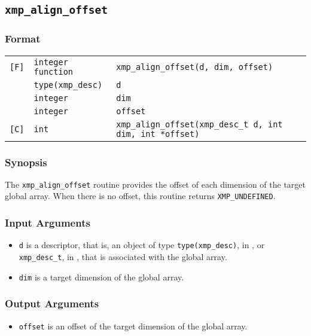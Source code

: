 \subsection{\tt xmp\_align\_offset}

\subsubsection*{Format}

\begin{tabular}{lll}

\verb![F]!& {\tt integer function}& {\tt xmp\_align\_offset(d, dim, offset)}\\
          & {\tt type(xmp\_desc)} & {\tt d}\\
          & {\tt integer} & {\tt dim}\\
          & {\tt integer} & {\tt offset}\\

\verb![C]!&  {\tt int}& {\tt xmp\_align\_offset(xmp\_desc\_t d, int dim, int *offset)}\\

\end{tabular}

\subsubsection*{Synopsis}

The {\tt xmp\_align\_offset} routine provides the offset of each dimension of the target global array. When there is no offset, this routine returns {\tt XMP\_UNDEFINED}.


\subsubsection*{Input Arguments}
\begin{itemize}
 \item {\tt d} is a descriptor, that is, an object of type 
       {\tt type(xmp\_desc)}, in {\XMPF}, or {\tt xmp\_desc\_t},
       in {\XMPC}, that is associated with the global array.
 \item {\tt dim} is a target dimension of the global array.
\end{itemize}

\subsubsection*{Output Arguments}
\begin{itemize}
 \item {\tt offset} is an offset of the target dimension of the global array.
\end{itemize}


